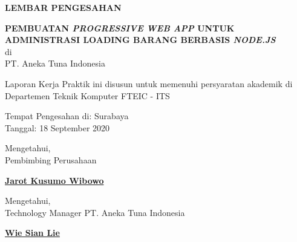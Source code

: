 \begin{center}
  {\Large \textbf{LEMBAR PENGESAHAN}}
  \vspace{4ex}


  {\large \textbf{PEMBUATAN \emph{PROGRESSIVE WEB APP} UNTUK ADMINISTRASI LOADING BARANG BERBASIS \emph{NODE.JS}}} \\
  di \\
  PT. Aneka Tuna Indonesia
  \vspace{4ex}

  Laporan Kerja Praktik ini disusun untuk memenuhi persyaratan akademik di Departemen Teknik Komputer FTEIC - ITS
  \vspace{2ex}

  Tempat Pengesahan di: Surabaya \\
  Tanggal: 18 September 2020
  \vspace{8ex}

  Mengetahui, \\
  Pembimbing Perusahaan
  \vspace{12ex}

  \textbf{\underline{Jarot Kusumo Wibowo}}
  \vspace{8ex}

  Mengetahui, \\
  Technology Manager PT. Aneka Tuna Indonesia
  \vspace{12ex}

  \textbf{\underline{Wie Sian Lie}}

\end{center}